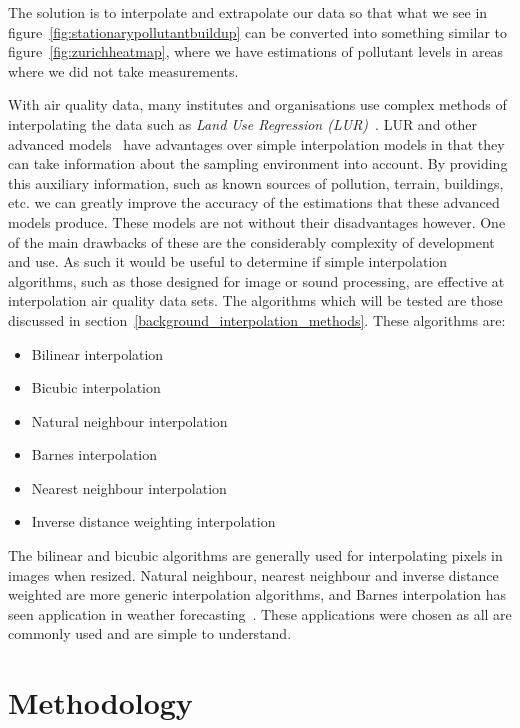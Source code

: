 		The solution is to interpolate and extrapolate our data so that what we see in figure~\ref{fig:stationarypollutantbuildup} can be converted into something similar to figure~\ref{fig:zurichheatmap}, where we have estimations of pollutant levels in areas where we did not take measurements. 

		With air quality data, many institutes and organisations use complex methods of interpolating the data such as \emph{Land Use Regression (LUR)}~\cite{lurtraffic}. LUR and other advanced models~\cite{reviewofaqmodels} have advantages over simple interpolation models in that they can take information about the sampling environment into account. By providing this auxiliary information, such as known sources of pollution, terrain, buildings, etc. we can greatly improve the accuracy of the estimations that these advanced models produce. These models are not without their disadvantages however. One of the main drawbacks of these are the considerably complexity of development and use. As such it would be useful to determine if simple interpolation algorithms, such as those designed for image or sound processing, are effective at interpolation air quality data sets. The algorithms which will be tested are those discussed in section~\ref{background_interpolation_methods}. These algorithms are: 

		\begin{itemize}
	        \item Bilinear interpolation
	        \item Bicubic interpolation
	        \item Natural neighbour interpolation
	        \item Barnes interpolation
	        \item Nearest neighbour interpolation
	        \item Inverse distance weighting interpolation
	    \end{itemize}

	    The bilinear and bicubic algorithms are generally used for interpolating pixels in images when resized. Natural neighbour, nearest neighbour and inverse distance weighted are more generic interpolation algorithms, and Barnes interpolation has seen application in weather forecasting~\cite{barnesinterpolation}. These applications were chosen as all are commonly used and are simple to understand. 



	\section{Methodology}\label{prediction_evaluation_methodology}

